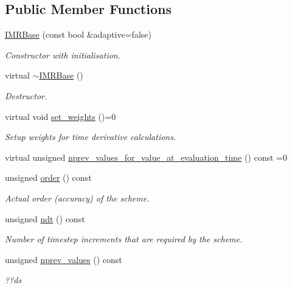 \subsection*{Public Member Functions}
\begin{DoxyCompactItemize}
\item 
\hyperlink{classoomph_1_1IMRBase_af0cee00bd97a2f6d8bafdb9f965a9982}{I\+M\+R\+Base} (const bool \&adaptive=false)
\begin{DoxyCompactList}\small\item\em Constructor with initialisation. \end{DoxyCompactList}\item 
virtual \hyperlink{classoomph_1_1IMRBase_a0d42ce83608fef0367c421b7c4cfeadf}{$\sim$\+I\+M\+R\+Base} ()
\begin{DoxyCompactList}\small\item\em Destructor. \end{DoxyCompactList}\item 
virtual void \hyperlink{classoomph_1_1IMRBase_a36b8a37b4c0bb9e8cca821bfb74fd373}{set\+\_\+weights} ()=0
\begin{DoxyCompactList}\small\item\em Setup weights for time derivative calculations. \end{DoxyCompactList}\item 
virtual unsigned \hyperlink{classoomph_1_1IMRBase_a93df756c834f8ba27956b8efb2af3636}{nprev\+\_\+values\+\_\+for\+\_\+value\+\_\+at\+\_\+evaluation\+\_\+time} () const =0
\item 
unsigned \hyperlink{classoomph_1_1IMRBase_a8e556df579d73b46214f8993b2ff12d1}{order} () const
\begin{DoxyCompactList}\small\item\em Actual order (accuracy) of the scheme. \end{DoxyCompactList}\item 
unsigned \hyperlink{classoomph_1_1IMRBase_a7d7c5c2dedead518b9b0882e74914f54}{ndt} () const
\begin{DoxyCompactList}\small\item\em Number of timestep increments that are required by the scheme. \end{DoxyCompactList}\item 
unsigned \hyperlink{classoomph_1_1IMRBase_a973faf88d44644bde495ffd6b9acbef1}{nprev\+\_\+values} () const
\begin{DoxyCompactList}\small\item\em ??ds \end{DoxyCompactList}\item 

\end{DoxyCompactItemize}
